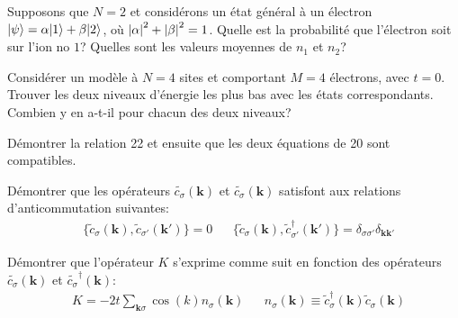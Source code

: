\documentclass{subfiles}[../main.tex]
\begin{document}
            \begin{problem}
                Supposons que $N=2$ et
            considérons un état général à un électron
            $|{\psi}\rangle=\alpha|{1}\rangle+\beta|{2}\rangle$,
            où $\abs{\alpha}^2+\abs{\beta}^2=1$. Quelle
            est la probabilité que l'électron soit sur
            l'ion no $1$? Quelles sont les valeurs moyennes
            de $n_1$ et $n_2$?
            \end{problem}

            \begin{problem}
                Considérer un modèle
            à $N=4$ sites et comportant $M=4$ électrons,
            avec $t=0$. Trouver les deux niveaux d'énergie
            les plus bas avec les états correspondants.
            Combien y en a-t-il pour chacun des deux
            niveaux?
            \end{problem}

            \begin{problem}
                Démontrer la relation 22
            et ensuite que les deux équations de 20 sont
            compatibles.
            \end{problem}

            \begin{problem}
                Démontrer que les opérateurs
                $\widetilde{c_\sigma}(\bm{k})$ et
                $\widetilde{c_\sigma}(\bm{k})$ satisfont
                aux relations d'anticommutation suivantes:
                \begin{align}
                    &\{\widetilde{c}_\sigma(\bm{k}),
                    \widetilde{c}_{\sigma'}(\bm{k'})\}=0
                    &&\{\widetilde{c}_\sigma(\bm{k}),
                    \widetilde{c}_{\sigma'}^\dagger(\bm{k'}
                    )\}=\delta_{\sigma\sigma'}
                    \delta_{\bm{k}\bm{k'}}
                \end{align}
            \end{problem}

            \begin{problem}
                Démontrer que l'opérateur $K$ s'exprime
                comme suit en fonction des opérateurs
                $\widetilde{c_\sigma}(\bm{k})$ et
                $\widetilde{c_\sigma}^\dagger(\bm{k})$:
                \begin{align}
                    &K=-2t\sum_{\bm{k}\sigma}
                    \cos(k)n_\sigma(\bm{k})
                    &&n_\sigma(\bm{k})\equiv
                    \widetilde{c}_\sigma^\dagger(\bm{k})
                    \widetilde{c}_\sigma(\bm{k})
                \end{align}
            \end{problem}
\end{document}
